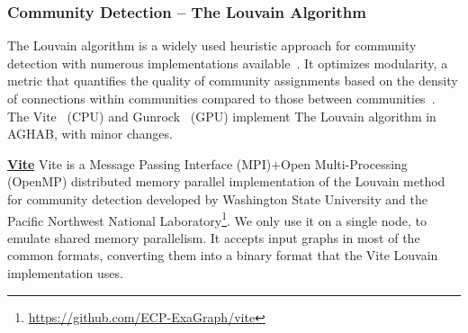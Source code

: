 \subsubsection{Community Detection -- The Louvain Algorithm}

The Louvain algorithm is a widely used heuristic approach for community detection with numerous implementations available~\cite{Blondel2008}. 
It optimizes modularity, a metric that quantifies the quality of community assignments based on the density of connections within communities compared to those between communities~\cite{Newman2004a}. 
The Vite~\cite{Ghosh2018, Ghosh2018a, Ghosh2019} (CPU) and Gunrock~\cite{Wang2016} (GPU) implement The Louvain algorithm in AGHAB, with minor changes.

    \underline{\textbf{Vite}}
        Vite is a Message Passing Interface (MPI)+Open Multi-Processing (OpenMP) distributed memory parallel implementation of the Louvain method for community detection developed by Washington State University and the Pacific Northwest National Laboratory\footnote{\url{https://github.com/ECP-ExaGraph/vite}}.
        We only use it on a single node, to emulate shared memory parallelism.
        It accepts input graphs in most of the common formats, converting them into a binary format that the Vite Louvain implementation uses.        

